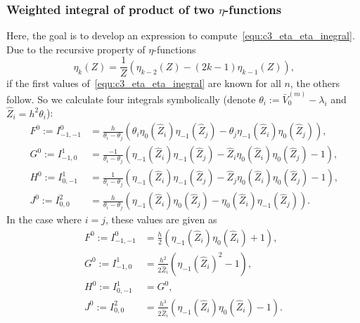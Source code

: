 \subsubsection{Weighted integral of product of two \texorpdfstring{$\eta$}{eta}-functions}

Here, the goal is to develop an expression to compute~\eqref{equ:c3_eta_eta_inegral}. Due to the recursive property of $\eta$-functions
$$
  \eta_k(Z) = \frac{1}{Z}\left(\eta_{k-2}(Z) - (2k-1)\eta_{k-1}(Z)  \right)\text{,}
$$
if the first values of~\eqref{equ:c3_eta_eta_inegral} are known for all $n$, the others follow. So we calculate four integrals symbolically (denote $\theta_i := \bar{V}_0^{(m)} -  \lambda_i$ and $\hat{Z}_i = h^2\theta_i$):
\begin{align*}
  F^0 := I_{-1,-1}^0 & = \frac{h}{\theta_i - \theta_j}\left(\theta_i \eta_0(\hat{Z}_i)\eta_{-1}(\hat{Z}_j) - \theta_j \eta_{-1}(\hat{Z}_i)\eta_0(\hat{Z}_j)\right) \text{,}  \\
  G^0 := I_{-1, 0}^1 & = \frac{-1}{\theta_i - \theta_j}\left(\eta_{-1}(\hat{Z}_i)\eta_{-1}(\hat{Z}_j) - \hat{Z}_i \eta_{0}(\hat{Z}_i)\eta_{0}(\hat{Z}_j)  - 1\right) \text{,} \\
  H^0 := I_{0, -1}^1 & = \frac{1}{\theta_i - \theta_j}\left(\eta_{-1}(\hat{Z}_i)\eta_{-1}(\hat{Z}_j) - \hat{Z}_j \eta_{0}(\hat{Z}_i)\eta_{0}(\hat{Z}_j)  - 1\right) \text{,}  \\
  J^0 := I_{0,0}^{2} & = \frac{h}{\theta_i - \theta_j}\left(\eta_{-1}(\hat{Z}_i)\eta_{0}(\hat{Z}_j) - \eta_{0}(\hat{Z}_i)\eta_{-1}(\hat{Z}_j)\right) \text{.}
\end{align*}
In the case where $i = j$, these values are given as
\begin{align*}
  F^0 := I_{-1,-1}^0 & = \frac{h}{2} \left(\eta_{-1}(\hat{Z}_i) \eta_{0}(\hat{Z}_i) + 1\right) \text{,}            \\
  G^0 := I_{-1, 0}^1 & = \frac{h^2}{2 \hat{Z}_i} \left(\eta_{-1}(\hat{Z}_i)^2 - 1\right) \text{,}                  \\
  H^0 := I_{0, -1}^1 & = G^0 \text{,}                                                                              \\
  J^0 := I_{0,0}^{2} & = \frac{h^3}{2 \hat{Z}_i} \left(\eta_{-1}(\hat{Z}_i) \eta_{0}(\hat{Z}_i) - 1\right) \text{.}
\end{align*}


